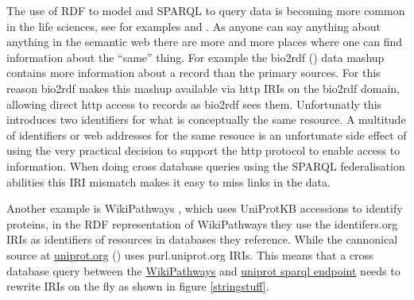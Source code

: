 \documentclass{bioinfo}
\begin{document}
The use of RDF to model and SPARQL to query data is becoming more common in the life sciences, see for examples \cite{Jupp01052014} and \cite{BioHack2011and2012}.
As anyone can say anything about anything in the semantic web there are more and more places where one can find information about the ``same'' thing.
For example the bio2rdf (\cite{Belleau2008706}) data mashup contains more information about a record than the primary sources.
For this reason bio2rdf makes this mashup available via http IRIs on the bio2rdf domain, allowing direct http access to records as bio2rdf sees them.
Unfortunatly this introduces two identifiers for what is conceptually the same resource.
A multitude of identifiers or web addresses for the same resouce is an unfortunate side effect of using the very practical decision to support the http protocol to enable access to information.
When doing cross database queries using the SPARQL federalisation abilities this IRI mismatch makes it easy to miss links in the data.

Another example is WikiPathways \cite{Kelder16112011}, which uses UniProtKB accessions to identify proteins, in the RDF representation of WikiPathways they use the
identifers.org IRIs as identifiers of resources in databases they reference.
While the cannonical source at \href{http://www.uniprot.org}{uniprot.org} (\cite{UniProt2013}) uses purl.uniprot.org IRIs.
This means that a cross database query between the \href{http://sparql.wikipathways.org/}{WikiPathways}  and \href{http://beta.sparql.uniprot.org/sparql}{uniprot sparql endpoint} needs to rewrite IRIs on the fly as shown in figure \ref{stringstuff}.
\end{document}
